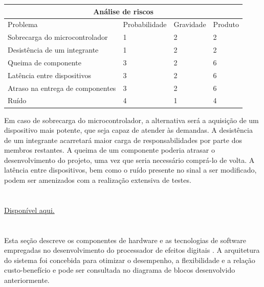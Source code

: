 \begin{tabular}{ |p{3cm}||p{3cm}|p{3cm}|p{3cm}|  }
 \hline
 \multicolumn{4}{|c|}{Análise de riscos} \\
 \hline
 Problema& Probabilidade &Gravidade&Produto\\
 \hline
 Sobrecarga do microcontrolador     &  1    & 2     &   2\\
 Desistência de um integrante       &   1   & 2     &2\\
 Queima de componente               &3      & 2     &  6\\
 Latência entre dispositivos        &3      & 2     &  6\\
 Atraso na entrega de componentes   &   3   & 2     &6\\
 Ruído                              & 4     & 1     &4\\
 \hline
\end{tabular}

Em caso de sobrecarga do microcontrolador, a alternativa será a aquisição de um dispositivo mais potente, que seja capaz de atender às demandas. A desistência de um integrante acarretará maior carga de responsabilidades por parte dos membros restantes. A queima de um componente poderia atrasar o desenvolvimento do projeto, uma vez que seria necessário comprá-lo de volta. A latência entre dispositivos, bem como o ruído presente no sinal a ser modificado, podem ser amenizados com a realização extensiva de testes.

\section{}
\href{https://docs.google.com/spreadsheets/d/1c_d0StAUM_7glkmwwl08T_zYdrpWEBFJgYbtEp_j8_Y/edit?gid=0#gid=0}{Disponível aqui.}

\section{}

Esta seção descreve os componentes de hardware e as tecnologias de software empregadas no desenvolvimento do processador de efeitos digitais . A arquitetura do sistema foi concebida para otimizar o desempenho, a flexibilidade e a relação custo-benefício e pode ser consultada no diagrama de blocos desenvolvido anteriormente.

\subsection{}

